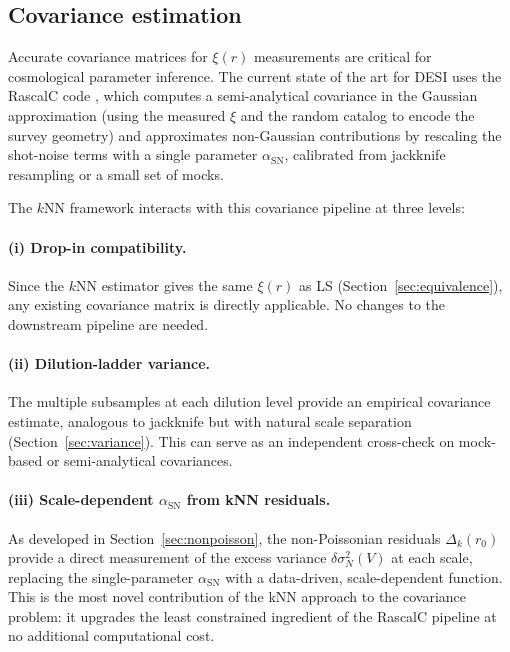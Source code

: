 \subsection{Covariance estimation}
\label{sec:covariance}

Accurate covariance matrices for $\xi(r)$ measurements are critical for cosmological parameter inference.  The current state of the art for DESI uses the RascalC code \citep{Philcox2020,Rashkovetskyi2024}, which computes a semi-analytical covariance in the Gaussian approximation (using the measured $\xi$ and the random catalog to encode the survey geometry) and approximates non-Gaussian contributions by rescaling the shot-noise terms with a single parameter $\alpha_{\mathrm{SN}}$, calibrated from jackknife resampling or a small set of mocks.

The $k$NN framework interacts with this covariance pipeline at three levels:

\paragraph{(i) Drop-in compatibility.}  Since the $k$NN estimator gives the same $\xi(r)$ as LS (Section~\ref{sec:equivalence}), any existing covariance matrix is directly applicable.  No changes to the downstream pipeline are needed.

\paragraph{(ii) Dilution-ladder variance.}  The multiple subsamples at each dilution level provide an empirical covariance estimate, analogous to jackknife but with natural scale separation (Section~\ref{sec:variance}).  This can serve as an independent cross-check on mock-based or semi-analytical covariances.

\paragraph{(iii) Scale-dependent $\alpha_{\mathrm{SN}}$ from kNN residuals.}  As developed in Section~\ref{sec:nonpoisson}, the non-Poissonian residuals $\Delta_k(r_0)$ provide a direct measurement of the excess variance $\delta\sigma^2_N(V)$ at each scale, replacing the single-parameter $\alpha_{\mathrm{SN}}$ with a data-driven, scale-dependent function.  This is the most novel contribution of the kNN approach to the covariance problem: it upgrades the least constrained ingredient of the RascalC pipeline at no additional computational cost.

